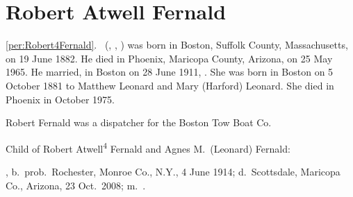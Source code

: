 \section{Robert Atwell Fernald}

\ref{per:Robert4Fernald}.\  (, , ) was born in Boston, Suffolk County, Massachusetts, on 19 June 1882.\cite{Robert4FernaldBirth} He died in Phoenix, Maricopa County, Arizona, on 25 May 1965.\cite{Robert4FernaldDeath} He married, in Boston on 28 June 1911, .\cite{Robert4FernaldMarriage} She was born in Boston on 5 October 1881\cite{AgnesLeonardBirth} to Matthew Leonard and Mary (Harford) Leonard.\cite{Robert4FernaldMarriage} She died in Phoenix in October 1975.\cite{AgnesLeonardDeath}

Robert Fernald was a dispatcher for the Boston Tow Boat Co.\cite{Robert4FernaldDeath}

\begin{KidsIntro}
	Child of Robert Atwell\textsuperscript{4} Fernald and Agnes M.\ (Leonard) Fernald:
\end{KidsIntro}

\begin{Kids}
	, b.\ prob.\ Rochester, Monroe Co., N.Y., 4 June 1914;\cite{Marion5FernaldSS,Census1915Marion5Fernald} d.\ Scottsdale, Maricopa Co., Arizona, 23 Oct.\ 2008;\cite{Marion5FernaldSS} m.\ .\cite{Robert4FernaldDeath,Marion5FernaldGrave}
\end{Kids}